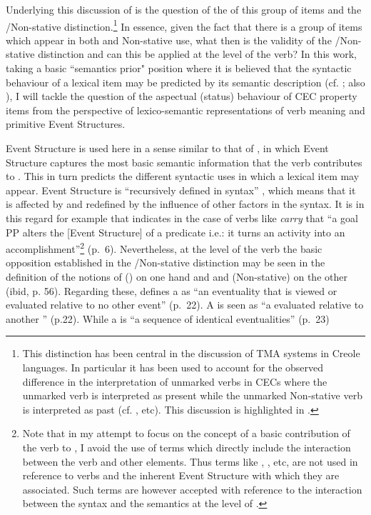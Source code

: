 Underlying this discussion of  is the question of the
 of this group of items and the \slash Non-stative
distinction.\footnote{This distinction has been central in the
  discussion of TMA systems in Creole languages.  In particular it has
  been used to account for the observed difference in the 
  interpretation of unmarked verbs in CECs where the unmarked 
  verb is interpreted as present while the unmarked Non-stative verb
  is interpreted as past (cf. \citealt{Bickerton1975,Winford1993}, etc). 
  This discussion is highlighted in .}
  In essence, given the fact that there is a group of
items which appear in both  and Non-stative use, what then is
the validity of the \slash Non-stative distinction and can this be
applied at the level of the verb?  In this work, taking a basic
``semantics prior" position where it is believed that the syntactic
behaviour of a lexical item may be predicted by its semantic
description (cf. \citealt{Dixon1977}; also \citealt{Levin1993}), I
will tackle the question of the aspectual (status) behaviour of CEC
property items from the perspective of lexico-semantic representations
of verb meaning and primitive Event Structures.

Event Structure is used here in a sense similar to that
of \citet{Pustejovsky1988,Pustejovsky1991},  in which Event Structure captures the most basic semantic information that the verb contributes to . This in turn predicts the different syntactic uses in which a lexical item may appear.
Event Structure is ``recursively defined in syntax'' \citet[55]{Pustejovsky1991}, which means that it is affected by and redefined by the influence of other factors in the syntax.  It is in this regard for example that \citet{MacDonald2008} indicates in the case of verbs like
\textit{carry}  that ``a goal PP alters the [Event Structure] of a predicate
i.e.: it turns an activity into an accomplishment''\footnote{Note that
  in my attempt to focus on the concept of a basic contribution of the
  verb to , I avoid the use of terms which directly include the
  interaction between the verb and other elements. Thus terms like
  , ,  etc, are not used in reference
  to verbs and the inherent Event Structure with which they are
  associated. Such terms are however accepted with reference to the
  interaction between the syntax and the semantics at the level of
  .} (p.~6).  Nevertheless, at the level of the verb
the basic opposition established in the \slash Non-stative
distinction may be seen in the definition of the notions of 
() on one hand and  and  (Non-stative) on the
other (ibid, p. 56).  Regarding these, \citet{Pustejovsky1988} defines
a  as ``an eventuality that is viewed or evaluated relative to no
other event'' (p.~22).  A  is seen as ``a 
evaluated relative to another '' (p.22).  While a
 is ``a sequence of identical eventualities'' (p.~23)


